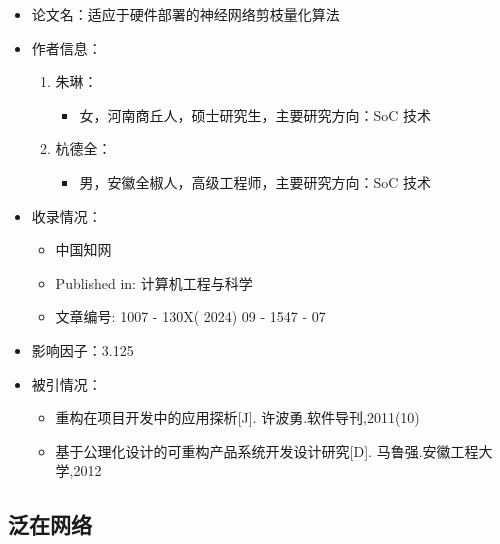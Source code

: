 \begin{itemize}
    \item 论文名：适应于硬件部署的神经网络剪枝量化算法
    \item 作者信息：
        \begin{enumerate}
            \item 朱琳：
                \begin{itemize}
                    \item 女，河南商丘人，硕士研究生，主要研究方向：SoC 技术 
                \end{itemize}
            \item 杭德全：
                \begin{itemize}
                    \item 男，安徽全椒人，高级工程师，主要研究方向：SoC 技术
                \end{itemize}
        \end{enumerate}

    \item 收录情况：
        \begin{itemize}
            \item 中国知网
            \item Published in: 计算机工程与科学
            \item 文章编号: 1007 - 130X( 2024) 09 - 1547 - 07
        \end{itemize}

    \item 影响因子：3.125
    \item 被引情况：
        \begin{itemize}
            \item  重构在项目开发中的应用探析[J]. 许波勇.软件导刊,2011(10)
            \item  基于公理化设计的可重构产品系统开发设计研究[D]. 马鲁强.安徽工程大学,2012
        \end{itemize}
\end{itemize}

\subsection{泛在网络}


